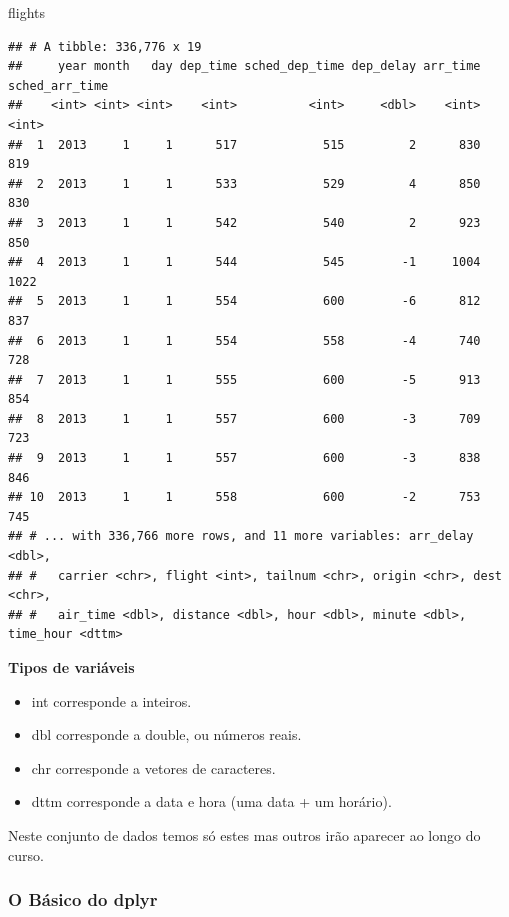 \documentclass[
]{article}
\newenvironment{Shaded}{\begin{snugshade}}{\end{snugshade}}
\newcommand{\NormalTok}[1]{#1}
\begin{document}
\begin{Shaded}
\begin{Highlighting}[]
\NormalTok{flights}
\end{Highlighting}
\end{Shaded}

\begin{verbatim}
## # A tibble: 336,776 x 19
##     year month   day dep_time sched_dep_time dep_delay arr_time sched_arr_time
##    <int> <int> <int>    <int>          <int>     <dbl>    <int>          <int>
##  1  2013     1     1      517            515         2      830            819
##  2  2013     1     1      533            529         4      850            830
##  3  2013     1     1      542            540         2      923            850
##  4  2013     1     1      544            545        -1     1004           1022
##  5  2013     1     1      554            600        -6      812            837
##  6  2013     1     1      554            558        -4      740            728
##  7  2013     1     1      555            600        -5      913            854
##  8  2013     1     1      557            600        -3      709            723
##  9  2013     1     1      557            600        -3      838            846
## 10  2013     1     1      558            600        -2      753            745
## # ... with 336,766 more rows, and 11 more variables: arr_delay <dbl>,
## #   carrier <chr>, flight <int>, tailnum <chr>, origin <chr>, dest <chr>,
## #   air_time <dbl>, distance <dbl>, hour <dbl>, minute <dbl>, time_hour <dttm>
\end{verbatim}

\textbf{Tipos de variáveis}

\begin{itemize}
\item
  int corresponde a inteiros.
\item
  dbl corresponde a double, ou números reais.
\item
  chr corresponde a vetores de caracteres.
\item
  dttm corresponde a data e hora (uma data + um horário).
\end{itemize}

Neste conjunto de dados temos só estes mas outros irão aparecer ao longo
do curso.

\hypertarget{o-buxe1sico-do-dplyr}{%
\subsubsection{O Básico do dplyr}\label{o-buxe1sico-do-dplyr}}
\end{document}
